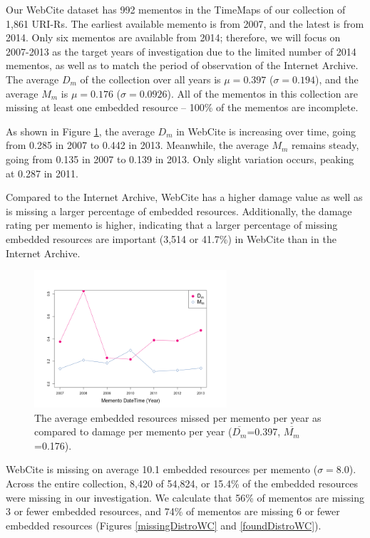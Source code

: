 Our WebCite dataset has 992 mementos in the TimeMaps of our collection of 1,861 URI-Rs. The earliest available memento is from 2007, and the latest is from 2014. Only six mementos are available from 2014; therefore, we will focus on 2007-2013 as the target years of investigation due to the limited number of 2014 mementos, as well as to match the period of observation of the Internet Archive. The average $D_m$ of the collection over all years is $\mu=0.397$ ($\sigma=0.194$), and the average  $M_m$ is $\mu=0.176$ ($\sigma=0.0926$). All of the mementos in this collection are missing at least one embedded resource -- 100\% of the mementos are incomplete. 

As shown in Figure \ref{missingByYearWC}, the average $D_m$ in WebCite is increasing over time, going from 0.285 in 2007 to 0.442 in 2013. Meanwhile, the average $M_m$ remains steady, going from 0.135 in 2007 to 0.139 in 2013. Only slight variation occurs, peaking at 0.287 in 2011. 

Compared to the Internet Archive, WebCite has a higher damage value as well as is missing a larger percentage of embedded resources. Additionally, the damage rating per memento is higher, indicating that a larger percentage of missing embedded resources are important (3,514 or 41.7\%) in WebCite than in the Internet Archive.

\begin{figure}[h!]
\includegraphics[width=270px]{./imgs/MissedAndDamagePerYear_webcite.png}
\caption{The average embedded resources missed per memento per year as compared to damage per memento per year ($\overline{D_m}$=0.397, $\overline{M_m}$=0.176).}
\label{missingByYearWC}
\end{figure}

WebCite is missing on average 10.1 embedded resources per memento ($\sigma=8.0$). Across the entire collection, 8,420 of 54,824, or 15.4\% of the embedded resources were missing in our investigation. We calculate that 56\% of mementos are missing 3 or fewer embedded resources, and 74\% of mementos are missing 6 or fewer embedded resources (Figures \ref{missingDistroWC} and \ref{foundDistroWC}).


